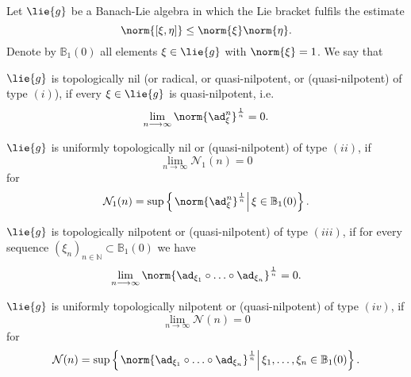\documentclass[
11pt,                          %
english                        %
]{article}
\begin{document}
\begin{definition}
	\label{Def:Nilpotencies1}
	Let $\lie{g}$ be a Banach-Lie algebra in which the Lie bracket fulfils the 
	estimate
	\begin{equation*}
		\norm{ [\xi, \eta] }
		\leq
		\norm{\xi}
		\norm{\eta}.
	\end{equation*}
	Denote by $\mathbb{B}_1(0)$ all elements $\xi \in \lie{g}$ with 
	$\norm{\xi} = 1$. We say that
	\begin{definitionlist}
		\item
		$\lie{g}$ is topologically nil (or radical, or quasi-nilpotent, or 
		(quasi-nilpotent) of type $(i)$), if every $\xi \in \lie{g}$ is 
		quasi-nilpotent, i.e.
		\begin{equation*}
			\lim_{n \longrightarrow \infty}
			\norm{\ad_{\xi}^n}^{\frac{1}{n}}
			=
			0.
		\end{equation*}
		
		\item
		$\lie{g}$ is uniformly topologically nil or (quasi-nilpotent) of type 
		$(ii)$, if
		\begin{equation*}
			\lim_{n \longrightarrow \infty}
			\mathcal{N}_1(n)
			=
			0
		\end{equation*}
		for
		\begin{equation}
			\mathcal{N}_1(n)
			=
			\sup \left\{ 
			\left.
				\norm{ \ad_{\xi}^n}^{\frac{1}{n}} 
			\right|
				\xi \in \mathbb{B}_1(0)
			\right\}.
		\end{equation}
		
		\item
		$\lie{g}$ is topologically nilpotent or (quasi-nilpotent) of type 
		$(iii)$, if for every sequence
		$(\xi_n)_{n \in \mathbb{N}} \subset \mathbb{B}_1(0)$ we have
		\begin{equation*}
			\lim_{n \longrightarrow \infty}
			\norm{ 
				\ad_{\xi_1} \circ \ldots \circ \ad_{\xi_n}
			}^{\frac{1}{n}}
			=
			0.
		\end{equation*}
		
		\item
		$\lie{g}$ is uniformly topologically nilpotent or (quasi-nilpotent) of 
		type $(iv)$, if
		\begin{equation*}
			\lim_{n \longrightarrow \infty}
			\mathcal{N}(n)
			=
			0
		\end{equation*}
		for
		\begin{equation}
			\mathcal{N}(n)
			=
			\sup \left\{ 
			\left.
				\norm{ 
					\ad_{\xi_1} \circ \ldots \circ \ad_{\xi_n}
				}^{\frac{1}{n}} 
			\right|
				\xi_1, \ldots, \xi_n \in \mathbb{B}_1(0)
			\right\}.
		\end{equation}
	\end{definitionlist}
\end{definition}
\end{document}
